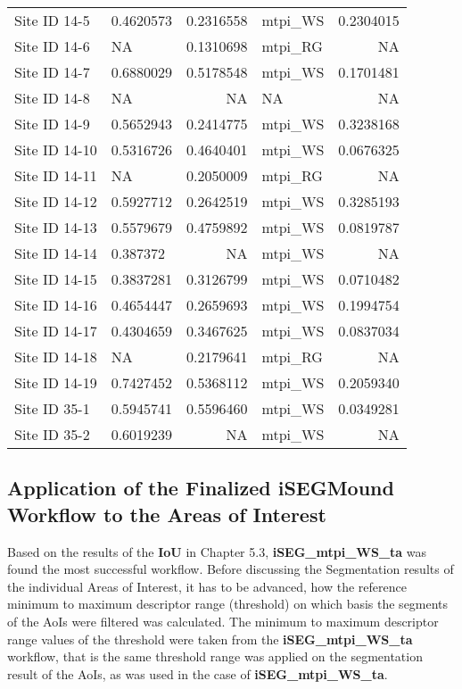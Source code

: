 \documentclass[
  12pt,
]{article}
\begin{document}
\begin{longtable}[t]{llrlr}
Site ID 14-5 & 0.4620573 & 0.2316558 & mtpi\_WS & 0.2304015\\
Site ID 14-6 & NA & 0.1310698 & mtpi\_RG & NA\\
\addlinespace
Site ID 14-7 & 0.6880029 & 0.5178548 & mtpi\_WS & 0.1701481\\
Site ID 14-8 & NA & NA & NA & NA\\
Site ID 14-9 & 0.5652943 & 0.2414775 & mtpi\_WS & 0.3238168\\
Site ID 14-10 & 0.5316726 & 0.4640401 & mtpi\_WS & 0.0676325\\
Site ID 14-11 & NA & 0.2050009 & mtpi\_RG & NA\\
\addlinespace
Site ID 14-12 & 0.5927712 & 0.2642519 & mtpi\_WS & 0.3285193\\
Site ID 14-13 & 0.5579679 & 0.4759892 & mtpi\_WS & 0.0819787\\
Site ID 14-14 & 0.387372 & NA & mtpi\_WS & NA\\
Site ID 14-15 & 0.3837281 & 0.3126799 & mtpi\_WS & 0.0710482\\
Site ID 14-16 & 0.4654447 & 0.2659693 & mtpi\_WS & 0.1994754\\
\addlinespace
Site ID 14-17 & 0.4304659 & 0.3467625 & mtpi\_WS & 0.0837034\\
Site ID 14-18 & NA & 0.2179641 & mtpi\_RG & NA\\
Site ID 14-19 & 0.7427452 & 0.5368112 & mtpi\_WS & 0.2059340\\
Site ID 35-1 & 0.5945741 & 0.5596460 & mtpi\_WS & 0.0349281\\
Site ID 35-2 & 0.6019239 & NA & mtpi\_WS & NA\\
\bottomrule
\end{longtable}

\hypertarget{application-of-the-finalized-isegmound-workflow-to-the-areas-of-interest}{%
\subsection{\texorpdfstring{\textbf{Application of the Finalized iSEGMound Workflow to the Areas of Interest}}{Application of the Finalized iSEGMound Workflow to the Areas of Interest}}\label{application-of-the-finalized-isegmound-workflow-to-the-areas-of-interest}}

Based on the results of the \textbf{IoU} in Chapter 5.3, \textbf{iSEG\_mtpi\_WS\_ta} was found the most successful workflow. Before discussing the Segmentation results of the individual Areas of Interest, it has to be advanced, how the reference minimum to maximum descriptor range (threshold) on which basis the segments of the AoIs were filtered was calculated.
The minimum to maximum descriptor range values of the threshold were taken from the \textbf{iSEG\_mtpi\_WS\_ta} workflow, that is the same threshold range was applied on the segmentation result of the AoIs, as was used in the case of \textbf{iSEG\_mtpi\_WS\_ta}.
\end{document}
